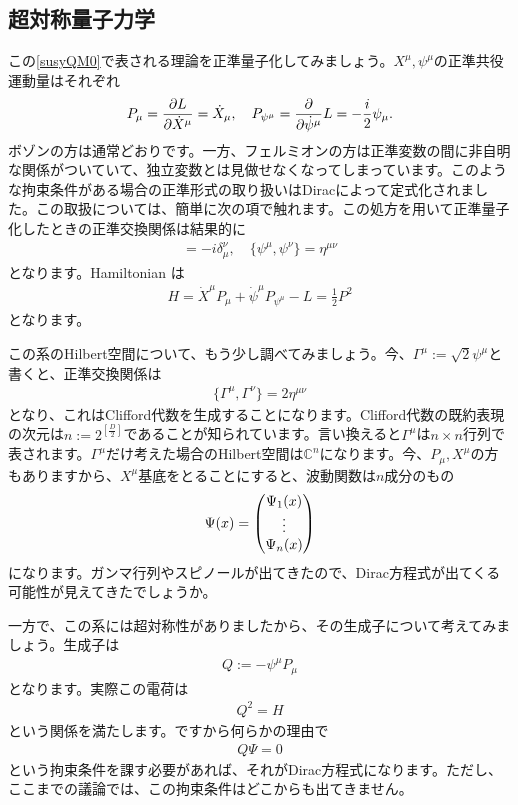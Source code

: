 \documentclass[report,paper=a4, fontsize=12pt, line_length=16cm, number_of_lines=34,dvipdfmx]{jlreq}
\numberwithin{equation}{chapter}
\numberwithin{equation}{section}
\newcommand{\Cb}{\mathbb{C}}
\begin{document}
\subsection{超対称量子力学}\label{subsec:susyQM}
この\eqref{susyQM0}で表される理論を正準量子化してみましょう。$X^{\mu},\psi^{\mu}$の正準共役運動量はそれぞれ
\begin{align}
  P_{\mu}=\pdv{L}{\dot{X}^{\mu}}=\dot{X}_{\mu},\quad
  P_{\psi^{\mu}}=\pdv{\dot{\psi}^{\mu}}L=-\frac{i}{2}\psi_{\mu}.
\end{align}
ボゾンの方は通常どおりです。一方、フェルミオンの方は正準変数の間に非自明な関係がついていて、独立変数とは見做せなくなってしまっています。このような拘束条件がある場合の正準形式の取り扱いはDiracによって定式化されました。この取扱については、簡単に次の項で触れます。この処方を用いて正準量子化したときの正準交換関係は結果的に
\begin{align}
  [P_{\mu},X^{\nu}]=-i\delta_{\mu}^{\nu},\quad
  \{\psi^{\mu},\psi^{\nu}\}=\eta^{\mu\nu}
\end{align}
となります。Hamiltonian は
\begin{align}
  H=\dot{X}^{\mu}P_{\mu}+\dot{\psi}^{\mu}P_{\psi^{\mu}}-L=\frac12 P^2
\end{align}
となります。

この系のHilbert空間について、もう少し調べてみましょう。今、$\Gamma^{\mu}:=\sqrt{2}\psi^{\mu}$と書くと、正準交換関係は
\begin{align}
  \{\Gamma^{\mu},\Gamma^{\nu}\}=2\eta^{\mu\nu}
\end{align}
となり、これはClifford代数を生成することになります。Clifford代数の既約表現の次元は$n:=2^{\left[\frac{D}{2}\right]}$であることが知られています。言い換えると$\Gamma^{\mu}$は$n\times n$行列で表されます。$\Gamma^{\mu}$だけ考えた場合のHilbert空間は$\Cb^n$になります。今、$P_{\mu},X^{\mu}$の方もありますから、$X^{\mu}$基底をとることにすると、波動関数は$n$成分のもの
\begin{align}
  \Psi(x)=\mqty(
    \Psi_1(x)\\
    \vdots\\
    \Psi_n(x)
  )
\end{align}
になります。ガンマ行列やスピノールが出てきたので、Dirac方程式が出てくる可能性が見えてきたでしょうか。

一方で、この系には超対称性がありましたから、その生成子について考えてみましょう。生成子は
\begin{align}
  Q:=-\psi^{\mu}P_{\mu}
\end{align}
となります。実際この電荷は
\begin{align}
  Q^2=H
\end{align}
という関係を満たします。ですから何らかの理由で
\begin{align}
  Q\Psi=0
\end{align}
という拘束条件を課す必要があれば、それがDirac方程式になります。ただし、ここまでの議論では、この拘束条件はどこからも出てきません。
\end{document}
